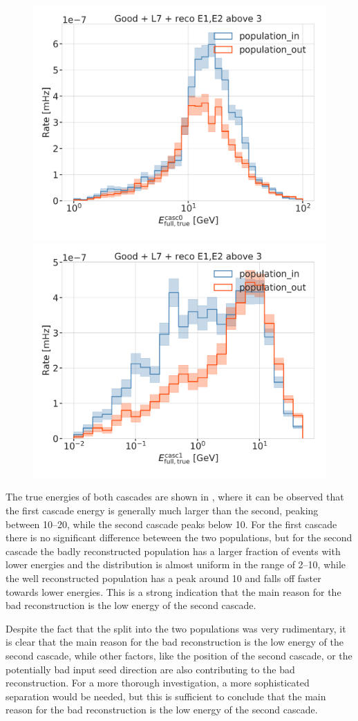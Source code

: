 \begin{figure}[h]
    \centering
    \includegraphics[width=0.49\linewidth]{figures/results/190607/second_population/casc0_energy.png}
    \includegraphics[width=0.49\linewidth]{figures/results/190607/second_population/casc1_energy.png}
    \caption[]{}
\end{figure}

The true energies of both cascades are shown in , where it can be observed that the first cascade energy is generally much larger than the second, peaking between \SIrange[range-phrase={~and~}]{10}{20}{\gev}, while the second cascade peaks below \SI{10}{\gev}. For the first cascade there is no significant difference beteween the two populations, but for the second cascade the badly reconstructed population has a larger fraction of events with lower energies and the distribution is almost uniform in the range of \SIrange{2}{10}{\gev}, while the well reconstructed population has a peak around \SI{10}{\gev} and falls off faster towards lower energies. This is a strong indication that the main reason for the bad reconstruction is the low energy of the second cascade.

Despite the fact that the split into the two populations was very rudimentary, it is clear that the main reason for the bad reconstruction is the low energy of the second cascade, while other factors, like the position of the second cascade, or the potentially bad input seed direction are also contributing to the bad reconstruction. For a more thorough investigation, a more sophisticated separation would be needed, but this is sufficient to conclude that the main reason for the bad reconstruction is the low energy of the second cascade.

